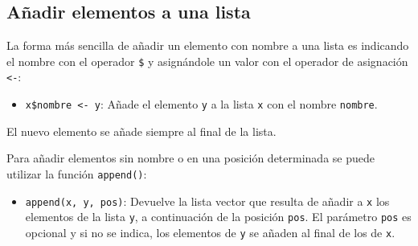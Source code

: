 \documentclass[
  a4paper,
]{scrreport}
\providecommand{\tightlist}{%
  \setlength{\itemsep}{0pt}\setlength{\parskip}{0pt}}\usepackage{longtable,booktabs,array}
\theoremstyle{definition}
\theoremstyle{definition}
\theoremstyle{remark}
\begin{document}
\subsection{Añadir elementos a una
lista}\label{auxf1adir-elementos-a-una-lista}

La forma más sencilla de añadir un elemento con nombre a una lista es
indicando el nombre con el operador \texttt{\$} y asignándole un valor
con el operador de asignación \texttt{\textless{}-}:

\begin{itemize}
\tightlist
\item
  \texttt{x\$nombre\ \textless{}-\ y}: Añade el elemento \texttt{y} a la
  lista \texttt{x} con el nombre \texttt{nombre}.
\end{itemize}

El nuevo elemento se añade siempre al final de la lista.

Para añadir elementos sin nombre o en una posición determinada se puede
utilizar la función \texttt{append()}:

\begin{itemize}
\tightlist
\item
  \texttt{append(x,\ y,\ pos)}: Devuelve la lista vector que resulta de
  añadir a \texttt{x} los elementos de la lista \texttt{y}, a
  continuación de la posición \texttt{pos}. El parámetro \texttt{pos} es
  opcional y si no se indica, los elementos de \texttt{y} se añaden al
  final de los de \texttt{x}.
\end{itemize}
\end{document}
